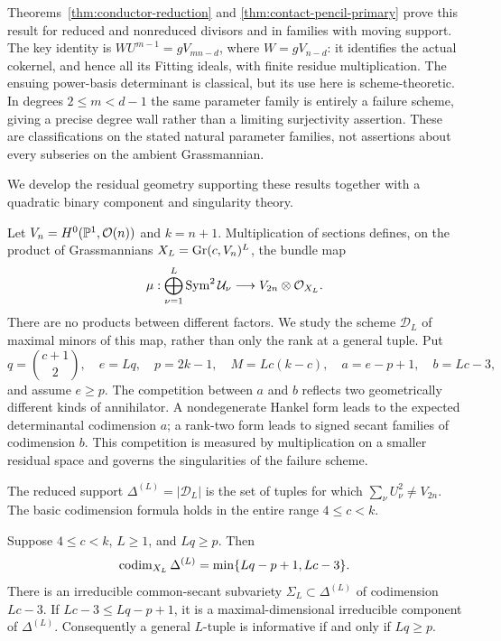 Theorems~\ref{thm:conductor-reduction} and
\ref{thm:contact-pencil-primary} prove this result for reduced and
nonreduced divisors and in families with moving support. The key
identity is $WU^{m-1}=gV_{mn-d}$, where $W=gV_{n-d}$: it identifies
the actual cokernel, and hence all its Fitting ideals, with finite
residue multiplication. The ensuing power-basis determinant is
classical, but its use here is scheme-theoretic. In degrees
$2\le m<d-1$ the same parameter family is entirely a failure
scheme, giving a precise degree wall rather than a limiting
surjectivity assertion. These are classifications on the stated
natural parameter families, not assertions about every subseries
on the ambient Grassmannian.

We develop the residual geometry supporting these results together
with a quadratic binary component and singularity theory.

Let $V_n=H^0(\mathbb P^1,\mathcal O(n))$ and $k=n+1$. Multiplication
of sections defines, on the product of Grassmannians
$X_L=\operatorname{Gr}(c,V_n)^L$, the bundle map
\begin{equation}\label{eq:intro-multiplication}
 \mu:\bigoplus_{\nu=1}^L\operatorname{Sym}^2\mathcal U_\nu
           \longrightarrow V_{2n}\otimes\mathcal O_{X_L}.
\end{equation}
There are no products between different factors. We study the scheme
$\mathscr D_L$ of maximal minors of this map, rather than only the
rank at a general tuple. Put
\[
 q=\binom{c+1}{2},\quad e=Lq,\quad p=2k-1,\quad
 M=Lc(k-c),\quad a=e-p+1,\quad b=Lc-3,
\]
and assume $e\ge p$. The competition between $a$ and $b$ reflects
two geometrically different kinds of annihilator. A nondegenerate
Hankel form leads to the expected determinantal codimension $a$;
a rank-two form leads to signed secant families of codimension $b$.
This competition is measured by multiplication on a smaller residual
space and governs the singularities of the failure scheme.

The reduced support $\Delta^{(L)}=|\mathscr D_L|$ is the set of
tuples for which $\sum_\nu U_\nu^2\ne V_{2n}$. The basic
codimension formula holds in the entire range $4\le c<k$.
\begin{theorem}\label{thm:global-intro}
Suppose $4\le c<k$, $L\ge1$, and $Lq\ge p$. Then
\begin{equation}\label{eq:codimension}
 \operatorname{codim}_{X_L}\Delta^{(L)}=\min\{Lq-p+1,Lc-3\}.
\end{equation}
There is an irreducible common-secant subvariety $\Sigma_L\subset\Delta^{(L)}$ of codimension $Lc-3$. If $Lc-3\le Lq-p+1$, it is a maximal-dimensional irreducible component of $\Delta^{(L)}$. Consequently a general $L$-tuple is informative if and only if $Lq\ge p$.
\end{theorem}

